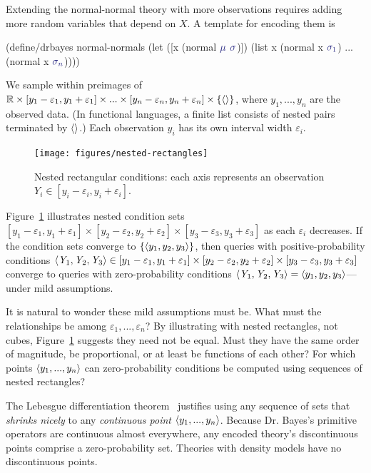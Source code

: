 Extending the normal-normal theory with more observations requires adding more random variables that depend on $\mathit{X}$.
A template for encoding them is
\begin{center}\singlespacing
\begin{schemedisplay}
(define/drbayes normal-normals
  (let ([x  (normal $\va{\mu}$ $\va{\sigma}$)])
    (list x (normal x $\va{\sigma_1}$) ... (normal x $\va{\sigma_n}$))))
\end{schemedisplay}
\end{center}
We sample within preimages of $\mathbb{R} \times [y_1-\varepsilon_1,y_1+\varepsilon_1] \times ... \times [y_n-\varepsilon_n,y_n+\varepsilon_n] \times \{{\langle{}\rangle}\}$, where $y_1,...,y_n$ are the observed data.
(In functional languages, a finite list consists of nested pairs terminated by $\langle{}\rangle$.)
Each observation $y_i$ has its own interval width $\varepsilon_i$.

\begin{figure}[tb!]\centering
\texttt{[image: figures/nested-rectangles]}
\caption[Nested rectangular conditions]{Nested rectangular conditions: each axis represents an observation {$\mathit{Y}_i \in [y_i-\varepsilon_i,y_i+\varepsilon_i]$}.}
\label{fig:nested-rectangles}
\end{figure}

Figure~\ref{fig:nested-rectangles} illustrates nested condition sets $[y_1-\varepsilon_1,y_1+\varepsilon_1] \times [y_2-\varepsilon_2,y_2+\varepsilon_2] \times [y_3-\varepsilon_3,y_3+\varepsilon_3]$ as each $\varepsilon_i$ decreases.
If the condition sets converge to $\{{\langle{y_1,y_2,y_3}\rangle}\}$, then queries with positive-probability conditions $\langle{\mathit{Y}_1,\mathit{Y}_2,\mathit{Y}_3}\rangle \in [y_1-\varepsilon_1,y_1+\varepsilon_1] \times [y_2-\varepsilon_2,y_2+\varepsilon_2] \times [y_3-\varepsilon_3,y_3+\varepsilon_3]$ converge to queries with zero-probability conditions $\langle{\mathit{Y}_1,\mathit{Y}_2,\mathit{Y}_3}\rangle = \langle{y_1,y_2,y_3}\rangle$---under mild assumptions.

It is natural to wonder these mild assumptions must be.
What must the relationships be among $\varepsilon_1,...,\varepsilon_n$?
By illustrating with nested rectangles, not cubes, Figure~\ref{fig:nested-rectangles} suggests they need not be equal.
Must they have the same order of magnitude, be proportional, or at least be functions of each other?
For which points $\langle{y_1,...,y_n}\rangle$ can zero-probability conditions be computed using sequences of nested rectangles?

The Lebesgue differentiation theorem~\cite[Chapter 7]{cit:rudin-1987book-analysis} justifies using any sequence of sets that \emph{shrinks nicely} to any \emph{continuous point} $\langle{y_1,...,y_n}\rangle$.
Because Dr. Bayes's primitive operators are continuous almost everywhere, any encoded theory's discontinuous points comprise a zero-probability set.
Theories with density models have no discontinuous points.

